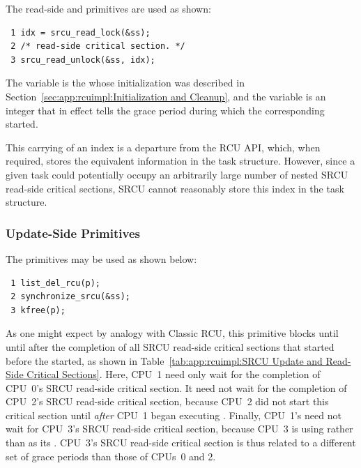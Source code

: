 The read-side  and  primitives
are used as shown:

\vspace{5pt}
\begin{minipage}[t]{\columnwidth}
\scriptsize
\begin{verbatim}
 1 idx = srcu_read_lock(&ss);
 2 /* read-side critical section. */
 3 srcu_read_unlock(&ss, idx);
\end{verbatim}
\end{minipage}
\vspace{5pt}

The  variable is the   whose initialization
was described in Section~\ref{sec:app:rcuimpl:Initialization and Cleanup},
and the  variable is an integer that in effect tells
 the grace period during which the corresponding
 started.

This carrying of an index is a departure from the RCU API, which,
when required, stores the equivalent information in the task structure.
However, since a given task could potentially occupy an arbitrarily large
number of nested SRCU read-side critical sections, SRCU cannot
reasonably store this index in the task structure.

\subsubsection{Update-Side Primitives}
\label{sec:app:rcuimpl:Update-Side Primitives}

The  primitives may be used as shown below:

\vspace{5pt}
\begin{minipage}[t]{\columnwidth}
\scriptsize
\begin{verbatim}
 1 list_del_rcu(p);
 2 synchronize_srcu(&ss);
 3 kfree(p);
\end{verbatim}
\end{minipage}
\vspace{5pt}

As one might expect by analogy with Classic RCU, this primitive blocks
until until after the completion of all SRCU read-side critical sections
that started before the  started, as shown
in Table~\ref{tab:app:rcuimpl:SRCU Update and Read-Side Critical Sections}.
Here, CPU~1 need only wait for the completion of CPU~0's SRCU read-side
critical section.
It need not wait for the completion of CPU~2's SRCU read-side critical
section, because CPU~2 did not start this critical section until \emph{after}
CPU~1 began executing .
Finally, CPU~1's  need not wait for CPU~3's
SRCU read-side critical section, because CPU~3 is using  rather
than  as its  .
CPU~3's SRCU read-side critical section is thus related to a different
set of grace periods than those of CPUs~0 and 2.

